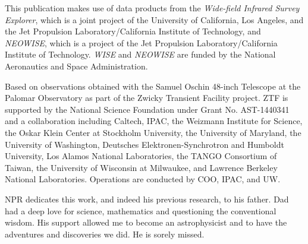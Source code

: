 \documentclass[fleqn,usenatbib]{mnras}
\begin{document}
This publication makes use of data products from the {\it Wide-field
Infrared Survey Explorer}, which is a joint project of the University
of California, Los Angeles, and the Jet Propulsion
Laboratory/California Institute of Technology, and {\it NEOWISE}, which is a
project of the Jet Propulsion Laboratory/California Institute of
Technology. {\it WISE} and {\it NEOWISE} are funded by the National Aeronautics
and Space Administration.

Based on observations obtained with the Samuel Oschin 48-inch Telescope at the Palomar Observatory as part of the Zwicky Transient Facility project. ZTF is supported by the National Science Foundation under Grant No. AST-1440341 and a collaboration including Caltech, IPAC, the Weizmann Institute for Science, the Oskar Klein Center at Stockholm University, the University of Maryland, the University of Washington, Deutsches Elektronen-Synchrotron and Humboldt University, Los Alamos National Laboratories, the TANGO Consortium of Taiwan, the University of Wisconsin at Milwaukee, and Lawrence Berkeley National Laboratories. Operations are conducted by COO, IPAC, and UW.
 
NPR dedicates this work, and indeed his previous research, to his
father. Dad had a deep love for science, mathematics and questioning
the conventional wisdom. His support allowed me to become an
astrophysicist and to have the adventures and discoveries we did. He
is sorely missed.





\bsp	%
\label{lastpage}
\end{document}
